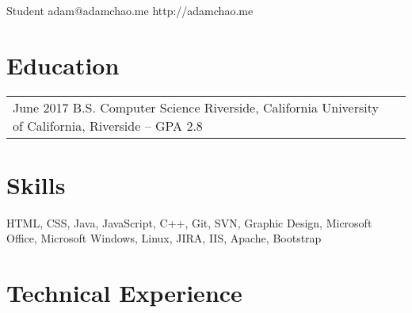 \documentclass[print]{friggeri-cv} %
\makeatletter
\renewenvironment{entrylist}{%
\par\begin{tabular*}{\textwidth}{@{\extracolsep{\fill}}ll}
}{%
\end{tabular*}\par
}
\makeatother
\begin{document}

{Student}
{adam@adamchao.me}
{http://adamchao.me}

\hfill

\section{Education}
\begin{entrylist}
\entry
{June 2017}
{B.S. Computer Science}
{Riverside, California}
{University of California, Riverside -- GPA 2.8}
\end{entrylist}


\section{Skills}
HTML, CSS, Java, JavaScript, C++, Git, SVN, Graphic Design, Microsoft Office, Microsoft Windows, Linux, JIRA, IIS, Apache, Bootstrap


\section{Technical Experience}
\end{document}
